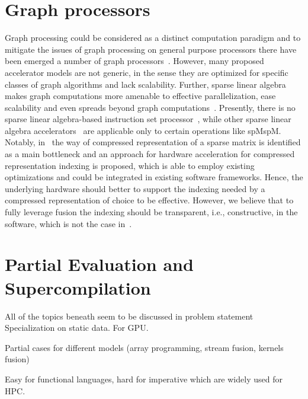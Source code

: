 \documentclass[10pt,conference]{IEEEtran}
\newcommand\question[1]{{\color{violet}#1}}
\begin{document}
\section{Graph processors}
Graph processing could be considered as a distinct computation paradigm and to mitigate the issues of graph processing on general purpose processors there have been emerged a number of graph processors~\cite{GraphProcessors}.
However, many proposed accelerator models are not generic, in the sense they are optimized for specific
classes of graph algorithms and lack scalability. Further, sparse linear algebra makes graph computations more amenable to effective parallelization, ease scalability and even spreads beyond graph computations~\cite{compBio}. 
Presently, there is no sparse linear algebra-based instruction set processor~\cite{Song_2016},
while other sparse linear algebra accelerators~\cite{CPU-FPGA,OuterSpace,zhang2020sparch} are applicable only to certain operations like spMspM.
Notably, in~\cite{smash} the way of compressed representation of a sparse matrix is identified as a main bottleneck and an approach for hardware acceleration for compressed representation indexing is proposed, which is able to employ existing optimizations and could be integrated in existing software frameworks.
Hence, the underlying hardware should better to support the indexing needed by a compressed representation of choice to be effective.
However, we believe that to fully leverage fusion the indexing should be transparent, i.e., constructive, in the software, which is not the case in~\cite{smash}.

\section{Partial Evaluation and Supercompilation}

\question{All of the topics beneath seem to be discussed in problem statement}
Specialization on static data.
For GPU.

Partial cases for different models (array programming, stream fusion, kernels fusion)

Easy for functional languages, hard for imperative which are widely used for HPC.
\end{document}
